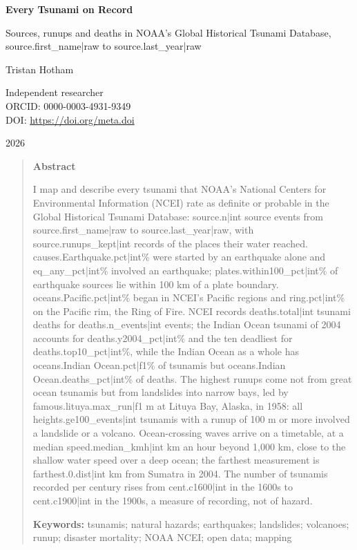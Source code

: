 \documentclass[11pt,a4paper]{article}
\begin{document}
\begin{center}
{\Large\bfseries Every Tsunami on Record\par}
\vspace{0.4em}
{\large Sources, runups and deaths in NOAA's Global Historical Tsunami Database,\\{{source.first_name|raw}} to {{source.last_year|raw}}\par}
\vspace{1.2em}
{\large Tristan Hotham\par}
\vspace{0.3em}
{\small Independent researcher\\
ORCID: 0000-0003-4931-9349\\
DOI: \href{https://doi.org/{{meta.doi}}}{https://doi.org/{{meta.doi}}}\par}
\vspace{0.8em}
2026
\end{center}

\begin{quote}
\small
\begin{center}\textbf{Abstract}\end{center}
I map and describe every tsunami that NOAA's National Centers for Environmental Information (NCEI) rate as definite or probable in the Global Historical Tsunami Database: {{source.n|int}} source events from {{source.first_name|raw}} to {{source.last_year|raw}}, with {{source.runups_kept|int}} records of the places their water reached. {{causes.Earthquake.pct|int}}\% were started by an earthquake alone and {{eq_any_pct|int}}\% involved an earthquake; {{plates.within100_pct|int}}\% of earthquake sources lie within 100 km of a plate boundary. {{oceans.Pacific.pct|int}}\% began in NCEI's Pacific regions and {{ring.pct|int}}\% on the Pacific rim, the Ring of Fire. NCEI records {{deaths.total|int}} tsunami deaths for {{deaths.n_events|int}} events; the Indian Ocean tsunami of 2004 accounts for {{deaths.y2004_pct|int}}\% and the ten deadliest for {{deaths.top10_pct|int}}\%, while the Indian Ocean as a whole has {{oceans.Indian Ocean.pct|f1}}\% of tsunamis but {{oceans.Indian Ocean.deaths_pct|int}}\% of deaths. The highest runups come not from great ocean tsunamis but from landslides into narrow bays, led by {{famous.lituya.max_run|f1}} m at Lituya Bay, Alaska, in 1958: all {{heights.ge100_events|int}} tsunamis with a runup of 100 m or more involved a landslide or a volcano. Ocean-crossing waves arrive on a timetable, at a median {{speed.median_kmh|int}} km an hour beyond 1,000 km, close to the shallow water speed over a deep ocean; the farthest measurement is {{farthest.0.dist|int}} km from Sumatra in 2004. The number of tsunamis recorded per century rises from {{cent.c1600|int}} in the 1600s to {{cent.c1900|int}} in the 1900s, a measure of recording, not of hazard.

\textbf{Keywords:} tsunamis; natural hazards; earthquakes; landslides; volcanoes; runup; disaster mortality; NOAA NCEI; open data; mapping
\end{quote}
\end{document}
